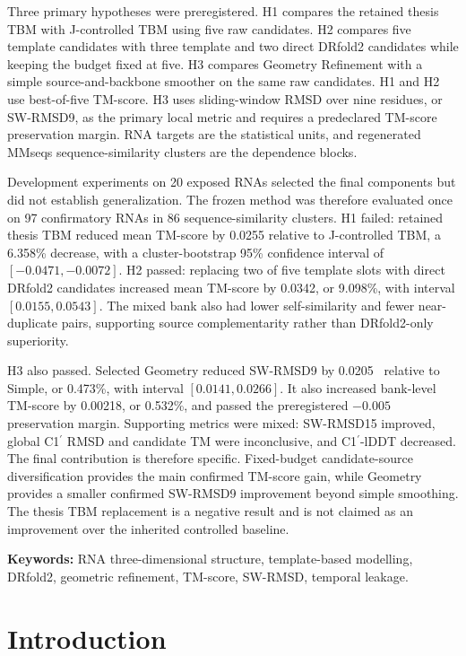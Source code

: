\documentclass[12pt,a4paper,oneside]{report}
\newcommand{\cprime}{C1$^{\prime}$}
\newcommand{\angstrom}{\text{\AA}}
\begin{document}
Three primary hypotheses were preregistered. H1 compares the retained thesis TBM with
J-controlled TBM using five raw candidates. H2 compares five template candidates with
three template and two direct DRfold2 candidates while keeping the budget fixed at
five. H3 compares Geometry Refinement with a simple source-and-backbone smoother on
the same raw candidates. H1 and H2 use best-of-five TM-score. H3 uses sliding-window
RMSD over nine residues, or SW-RMSD9, as the primary local metric and requires a
predeclared TM-score preservation margin. RNA targets are the statistical units, and
regenerated MMseqs sequence-similarity clusters are the dependence blocks.

Development experiments on 20 exposed RNAs selected the final components but did not
establish generalization. The frozen method was therefore evaluated once on 97
confirmatory RNAs in 86 sequence-similarity clusters. H1 failed: retained thesis TBM
reduced mean TM-score by 0.0255 relative to J-controlled TBM, a 6.358\% decrease, with
a cluster-bootstrap 95\% confidence interval of $[-0.0471,-0.0072]$. H2 passed:
replacing two of five template slots with direct DRfold2 candidates increased mean
TM-score by 0.0342, or 9.098\%, with interval $[0.0155,0.0543]$. The mixed bank also
had lower self-similarity and fewer near-duplicate pairs, supporting source
complementarity rather than DRfold2-only superiority.

H3 also passed. Selected Geometry reduced SW-RMSD9 by 0.0205~\angstrom{} relative to
Simple, or 0.473\%, with interval $[0.0141,0.0266]$. It also increased bank-level
TM-score by 0.00218, or 0.532\%, and passed the preregistered $-0.005$ preservation
margin. Supporting metrics were mixed: SW-RMSD15 improved, global \cprime{} RMSD and
candidate TM were inconclusive, and \cprime{}-lDDT decreased. The final contribution
is therefore specific. Fixed-budget candidate-source diversification provides the
main confirmed TM-score gain, while Geometry provides a smaller confirmed
SW-RMSD9 improvement beyond simple smoothing. The thesis TBM replacement is a
negative result and is not claimed as an improvement over the inherited controlled
baseline.

\noindent\textbf{Keywords:} RNA three-dimensional structure, template-based modelling,
DRfold2, geometric refinement, TM-score, SW-RMSD, temporal leakage.

\tableofcontents
\listoftables
\clearpage
{}

\chapter{Introduction}
\end{document}
